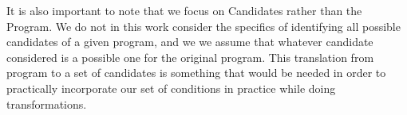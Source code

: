     It is also important to note that we focus on Candidates rather than the Program.  We do not in this
    work consider the specifics of identifying all possible candidates of a given program, and we we assume that whatever candidate considered is a possible one for the original program. 
    This translation from program to a set of candidates is something that would be needed in order to practically incorporate our set of conditions in practice while doing transformations.
    
    
    